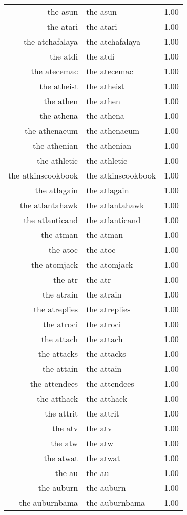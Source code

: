 \begin{table}[ht]
\begin{tabular}{rlr}
  the asun & the asun & 1.00 \\ 
  the atari & the atari & 1.00 \\ 
  the atchafalaya & the atchafalaya & 1.00 \\ 
  the atdi & the atdi & 1.00 \\ 
  the atecemac & the atecemac & 1.00 \\ 
  the atheist & the atheist & 1.00 \\ 
  the athen & the athen & 1.00 \\ 
  the athena & the athena & 1.00 \\ 
  the athenaeum & the athenaeum & 1.00 \\ 
  the athenian & the athenian & 1.00 \\ 
  the athletic & the athletic & 1.00 \\ 
  the atkinscookbook & the atkinscookbook & 1.00 \\ 
  the atlagain & the atlagain & 1.00 \\ 
  the atlantahawk & the atlantahawk & 1.00 \\ 
  the atlanticand & the atlanticand & 1.00 \\ 
  the atman & the atman & 1.00 \\ 
  the atoc & the atoc & 1.00 \\ 
  the atomjack & the atomjack & 1.00 \\ 
  the atr & the atr & 1.00 \\ 
  the atrain & the atrain & 1.00 \\ 
  the atreplies & the atreplies & 1.00 \\ 
  the atroci & the atroci & 1.00 \\ 
  the attach & the attach & 1.00 \\ 
  the attacks & the attacks & 1.00 \\ 
  the attain & the attain & 1.00 \\ 
  the attendees & the attendees & 1.00 \\ 
  the atthack & the atthack & 1.00 \\ 
  the attrit & the attrit & 1.00 \\ 
  the atv & the atv & 1.00 \\ 
  the atw & the atw & 1.00 \\ 
  the atwat & the atwat & 1.00 \\ 
  the au & the au & 1.00 \\ 
  the auburn & the auburn & 1.00 \\ 
  the auburnbama & the auburnbama & 1.00 \\ 

\end{tabular}
\end{table}
